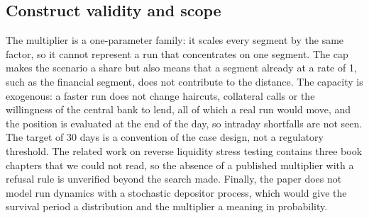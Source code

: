 \subsection{Construct validity and scope}

The multiplier is a one-parameter family: it scales every segment by the same factor, so it cannot represent a run that concentrates on one segment. The cap makes the scenario a share but also means that a segment already at a rate of 1, such as the financial segment, does not contribute to the distance. The capacity is exogenous: a faster run does not change haircuts, collateral calls or the willingness of the central bank to lend, all of which a real run would move, and the position is evaluated at the end of the day, so intraday shortfalls are not seen. The target of 30 days is a convention of the case design, not a regulatory threshold. The related work on reverse liquidity stress testing contains three book chapters that we could not read, so the absence of a published multiplier with a refusal rule is unverified beyond the search made. Finally, the paper does not model run dynamics with a stochastic depositor process, which would give the survival period a distribution and the multiplier a meaning in probability.
